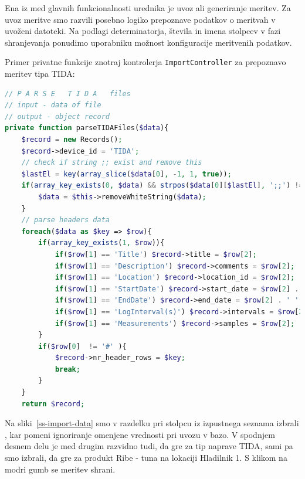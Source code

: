 \documentclass[a4paper, 12pt]{book}
\begin{document}
Ena iz med glavnih funkcionalnosti urednika je uvoz ali generiranje meritev. 
Za uvoz meritve smo razvili posebno logiko prepoznave podatkov o meritvah v uvoženi datoteki. Na podlagi determinatorja, števila in imena stolpcev v fazi shranjevanja ponudimo uporabniku možnost konfiguracije meritvenih podatkov.

\newpage

Primer privatne funkcije znotraj kontrolerja \verb=ImportController= za prepoznavo meritev tipa TIDA:

\begin{lstlisting}[language=PHP, style=mystyle]
// P A R S E   T I D A   files
// input - data of file
// output - object record
private function parseTIDAFiles($data){
    $record = new Records();
    $record->device_id = 'TIDA';
    // check if string ;; exist and remove this
    $lastEl = key(array_slice($data[0], -1, 1, true));
    if(array_key_exists(0, $data) && strpos($data[0][$lastEl], ';;') !== false){
        $data = $this->removeWhiteString($data);
    }
    // parse headers data
    foreach($data as $key => $row){
        if(array_key_exists(1, $row)){
            if($row[1] == 'Title') $record->title = $row[2];
            if($row[1] == 'Description') $record->comments = $row[2];
            if($row[1] == 'Location') $record->location_id = $row[2];
            if($row[1] == 'StartDate') $record->start_date = $row[2] . ' ' . $row[3];
            if($row[1] == 'EndDate') $record->end_date = $row[2] . ' ' . $row[3];
            if($row[1] == 'LogInterval(s)') $record->intervals = $row[2];
            if($row[1] == 'Measurements') $record->samples = $row[2];
        }
        if($row[0]  != '#' ){ 
            $record->nr_header_rows = $key; 
            break;
        }
    }
    return $record;
\end{lstlisting}


Na sliki~\ref{ss-import-data} smo v razdelku  pri stolpcu  iz izpustnega seznama izbrali , kar pomeni ignoriranje omenjene vrednosti pri uvozu v bazo. V spodnjem desnem delu je med drugim razvidno tudi, da gre za tip naprave TIDA, sami pa smo izbrali, da gre za produkt Ribe - tuna na lokaciji Hladilnik 1. S klikom na modri gumb  se meritev shrani.
\end{document}
